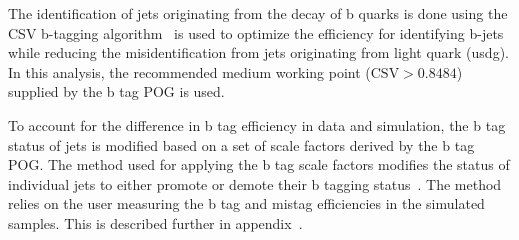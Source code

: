 The identification of jets originating from the decay of b quarks is
done using the CSV b-tagging algorithm~\cite{Sirunyan:2298594} is used
to optimize the efficiency for identifying b-jets while reducing the
misidentification from jets originating from light quark (usdg).  In
this analysis, the recommended medium working point ($\text{CSV} >
0.8484$) supplied by the b tag POG is used.  

To account for the difference in b tag efficiency in data and
simulation, the b tag status of jets is modified based on a set of
scale factors derived by the b tag POG.  The method used for applying
the b tag scale factors modifies the status of individual jets to either
promote or demote their b tagging status~\cite{twiki:btag_method}.  The
method relies on the user measuring the b tag and mistag efficiencies
in the simulated samples.  This is described further in
appendix~\label{app:btag}.
